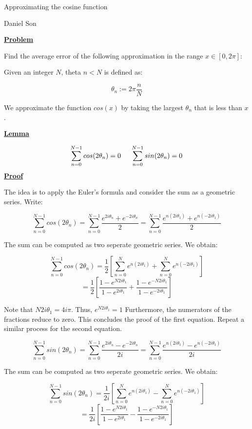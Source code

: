 \documentclass{article}
\newcommand{\new}[1]{
    \vspace{2mm}
    \noindent
    \textbf{
    \underline{#1}}
}
\def\th{{\theta}}
\newcommand{\Proof}{{
    \vspace{2mm}
    \noindent
    \textbf{
    \underline{Proof}}
}
}
\begin{document}
\begin{center}
    \LARGE
    Approximating the cosine function

    \normalsize
    Daniel Son
\end{center}

\new{Problem}
Find the average error of the following approximation
in the range $x \in [0, 2\pi]$:

Given an integer $N$, theta $n < N$ is defined as:

\[
    \th_n := 2\pi\frac{n}{N}
\]

We approximate the function $cos(x)$ by taking 
the largest $\th_n$ that is less than $x$. 

\new{Lemma}
\[
    \sum_{n=0}^{N-1}cos(2\th_n) = 0
    \hspace{5mm}
    \sum_{n=0}^{N-1}sin(2\th_n) = 0
\]
\Proof
The idea is to apply the Euler's formula 
and consider the sum as a geometric series. 
Write:

\[
    \sum_{n=0}^{N-1}cos(2\th_n)
    =
    \sum_{n=0}^{N-1}
    \frac
    {
        e^{2i\th_n}+
        e^{-2i\th_n}
    }
    {2}
     =
    \sum_{n=0}^{N-1}
    \frac
    {
        e^{n(2i\th_1)}+
        e^{n (-2i\th_1)}
    }
    {2}
\]

The sum can be computed as two seperate 
geometric series. We obtain:

\[
     \sum_{n=0}^{N-1}cos(2\th_n)
    =
    \frac{1}{2}
    \left[
        \sum_{n = 0}^{N}e^{n(2i\th_1)}
        +
        \sum_{n = 0}^{N}e^{n(-2i\th_1)}
    \right]
\]
\[
    = 
    \frac{1}{2}
    \left[
        \frac{1-e^{N2i\th_1}}{1-e^{2i\th_1}}
        +
        \frac{1-e^{-N2i\th_1}}{1-e^{-2i\th_1}}
    \right]
\]

Note that $N2i\th_1 = 4i\pi$. Thus, 
$e^{N2i\th_1} = 1$
Furthermore, the numerators of the fractions
reduce to zero. This concludes the proof of the first 
equation. Repeat a similar process for the 
second equation.  


\[
    \sum_{n=0}^{N-1}sin(2\th_n)
    =
    \sum_{n=0}^{N-1}
    \frac
    {
        e^{2i\th_n}-
        e^{-2i\th_n}
    }
    {2i}
     =
    \sum_{n=0}^{N-1}
    \frac
    {
        e^{n(2i\th_1)}-
        e^{n (-2i\th_1)}
    }
    {2i}
\]

The sum can be computed as two seperate 
geometric series. We obtain:

\[
     \sum_{n=0}^{N-1}sin(2\th_n)
    =
    \frac{1}{2i}
    \left[
        \sum_{n = 0}^{N}e^{n(2i\th_1)}
        -
        \sum_{n = 0}^{N}e^{n(-2i\th_1)}
    \right]
\]
\[
    = 
    \frac{1}{2i}
    \left[
        \frac{1-e^{N2i\th_1}}{1-e^{2i\th_1}}
        -
        \frac{1-e^{-N2i\th_1}}{1-e^{-2i\th_1}}
    \right]
\]
\end{document}
